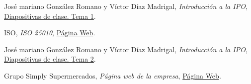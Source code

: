 \documentclass[a4paper,11pt]{article}
\begin{document}
\begin{thebibliography}{9}
  José mariano González Romano y Víctor Díaz Madrigal,
  \textit{Introducción a la IPO},
  \href{https://s3-eu-central-1.amazonaws.com/learn-eu-central-1-prod-fleet01-xythos/5ac734ed505df/1497177?response-content-disposition=inline%3B%20filename%2A%3DUTF-8%27%27IPO-2018-19-01-Introducci%25C3%25B3n%2520a%2520la%2520IPO.pdf&response-content-type=application%2Fpdf&X-Amz-Algorithm=AWS4-HMAC-SHA256&X-Amz-Date=20181009T201303Z&X-Amz-SignedHeaders=host&X-Amz-Expires=21600&X-Amz-Credential=AKIAIZ3QX2YUHH4EOO3A%2F20181009%2Feu-central-1%2Fs3%2Faws4_request&X-Amz-Signature=91e59768c9f86b77180953691bdcae19f7300073d4ad74d0949de1515d0b6f55}{Diapositivas de clase. Tema 1}.

ISO,
\textit{ISO 25010},
\href{https://iso25000.com/index.php/normas-iso-25000/iso-25010/23-usabilidad}{Página Web}.

José mariano González Romano y Víctor Díaz Madrigal,
\textit{Introducción a la IPO},
\href{https://s3-eu-central-1.amazonaws.com/learn-eu-central-1-prod-fleet01-xythos/5ac734ed505df/1548262?response-content-disposition=inline%3B%20filename%2A%3DUTF-8%27%27IPO-2018-19-02-Usabilidad.pdf&response-content-type=application%2Fpdf&X-Amz-Algorithm=AWS4-HMAC-SHA256&X-Amz-Date=20181009T201947Z&X-Amz-SignedHeaders=host&X-Amz-Expires=21600&X-Amz-Credential=AKIAIZ3QX2YUHH4EOO3A%2F20181009%2Feu-central-1%2Fs3%2Faws4_request&X-Amz-Signature=b0015ef5189a68a14076abd0ef07c9f15c07aa1ef5bebf8a545bf456bbfafe84}{Diapositivas de clase. Tema 2}.

Grupo Simply Supermercados,
\textit{Página web de la empresa},
\href{www.simply.es}{Página Web}.


\end{thebibliography}
\end{document}
